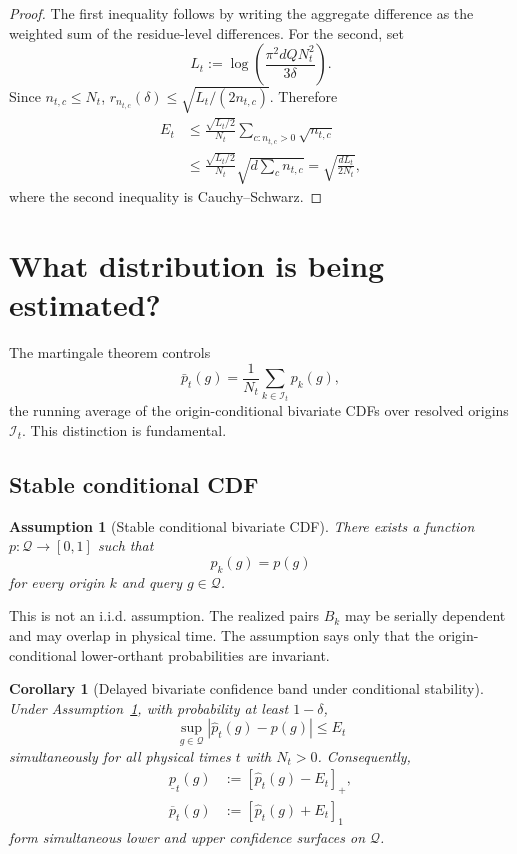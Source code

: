 \documentclass[11pt]{article}
\newtheorem{corollary}[theorem]{Corollary}
\newtheorem{assumption}[theorem]{Assumption}
\newcommand{\Q}{\mathcal{Q}}
\newcommand{\I}{\mathcal{I}}
\newcommand{\1}{\mathbf{1}}
\begin{document}
\begin{proof}
The first inequality follows by writing the aggregate difference as the
weighted sum of the residue-level differences.  For the second, set
\[
    L_t
    :=
    \log\!\left(
        \frac{\pi^2 dQ N_t^2}{3\delta}
    \right).
\]
Since $n_{t,c}\le N_t$,
$r_{n_{t,c}}(\delta)\le\sqrt{L_t/(2n_{t,c})}$.  Therefore
\begin{align*}
    E_t
    &\le
    \frac{\sqrt{L_t/2}}{N_t}
    \sum_{c:n_{t,c}>0}\sqrt{n_{t,c}}
    \\
    &\le
    \frac{\sqrt{L_t/2}}{N_t}
    \sqrt{d\sum_c n_{t,c}}
    =
    \sqrt{\frac{dL_t}{2N_t}},
\end{align*}
where the second inequality is Cauchy--Schwarz.
\end{proof}

\section{What distribution is being estimated?}

The martingale theorem controls
\[
    \bar p_t(g)
    =
    \frac1{N_t}\sum_{k\in\I_t} p_k(g),
\]
the running average of the origin-conditional bivariate CDFs over resolved
origins $\I_t$.  This distinction is fundamental.

\subsection{Stable conditional CDF}

\begin{assumption}[Stable conditional bivariate CDF]
\label{ass:stable-conditional}
There exists a function $p:\Q\to[0,1]$ such that
\[
    p_k(g)=p(g)
\]
for every origin $k$ and query $g\in\Q$.
\end{assumption}

This is not an i.i.d. assumption.  The realized pairs $B_k$ may be serially
dependent and may overlap in physical time.  The assumption says only that the
origin-conditional lower-orthant probabilities are invariant.

\begin{corollary}[Delayed bivariate confidence band under conditional stability]
\label{cor:stable-band}
Under Assumption~\ref{ass:stable-conditional}, with probability at least
$1-\delta$,
\begin{equation}
    \sup_{g\in\Q}
    \left|
        \widehat p_t(g)-p(g)
    \right|
    \le E_t
    \label{eq:stable-cdf-band}
\end{equation}
simultaneously for all physical times $t$ with $N_t>0$.
Consequently,
\begin{align}
    \underline p_t(g)
    &:=
    \left[\widehat p_t(g)-E_t\right]_+,
    \\
    \overline p_t(g)
    &:=
    \left[\widehat p_t(g)+E_t\right]_1
\end{align}
form simultaneous lower and upper confidence surfaces on $\Q$.
\end{corollary}
\end{document}
